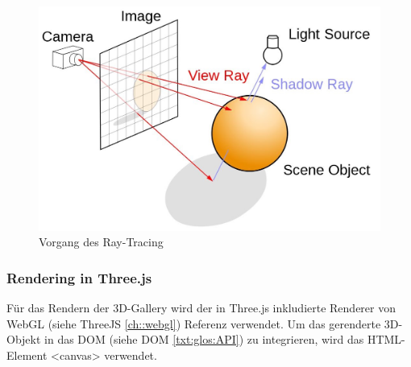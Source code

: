 \begin{figure} [h]
    \centering
    \includegraphics[scale=0.3]{pics/ray-tracing.jpg}
    \caption{Vorgang des Ray-Tracing \cite{RayTracingRasterization}}
    \label{fig:impl:ray-tracing}
\end{figure}


\subsubsection{Rendering in Three.js}
Für das Rendern der 3D-Gallery wird der in Three.js inkludierte Renderer von WebGL (siehe ThreeJS \ref{ch::webgl}) Referenz verwendet. Um das gerenderte 3D-Objekt in das DOM (siehe DOM \ref{txt:glos:API}) zu integrieren, wird das HTML-Element <canvas> verwendet. \cite{ThreejsWebGLRenderer}


